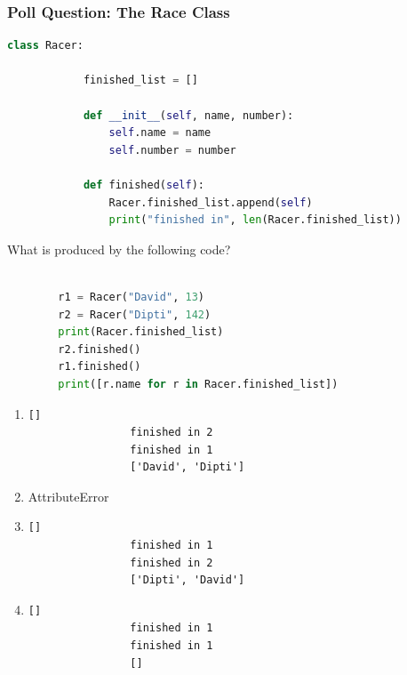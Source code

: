 \documentclass{beamer}
\begin{document}
%
%
%
\begin{frame}[fragile]
    \frametitle{Poll Question: The Race Class}
    \begin{minipage}{0.69\textwidth}
        \begin{lstlisting}[language=Python, autogobble, basicstyle=\tiny]
        class Racer:

            finished_list = []

            def __init__(self, name, number):
                self.name = name
                self.number = number

            def finished(self):
                Racer.finished_list.append(self)
                print("finished in", len(Racer.finished_list))

        \end{lstlisting}
        \pause
        \vspace{0.5cm}
        What is produced by the following code?
        \vfill
        \begin{lstlisting}[language=Python, autogobble, basicstyle=\tiny]

        r1 = Racer("David", 13)
        r2 = Racer("Dipti", 142)
        print(Racer.finished_list)
        r2.finished()
        r1.finished()
        print([r.name for r in Racer.finished_list])
        \end{lstlisting}
    \end{minipage}
    \hfill
    \begin{minipage}{0.29\textwidth}
        \begin{enumerate}[A]
            \item 
                \begin{lstlisting}[autogobble, basicstyle=\tiny]
                []
                finished in 2
                finished in 1
                ['David', 'Dipti']
                \end{lstlisting}
            \item AttributeError
            \item 
                \begin{lstlisting}[autogobble, basicstyle=\tiny]
                []
                finished in 1
                finished in 2
                ['Dipti', 'David']
                \end{lstlisting}
            \item 
                \begin{lstlisting}[autogobble, basicstyle=\tiny]
                []
                finished in 1
                finished in 1
                []
                \end{lstlisting}
        \end{enumerate}
    \end{minipage}
\end{frame}
\end{document}
